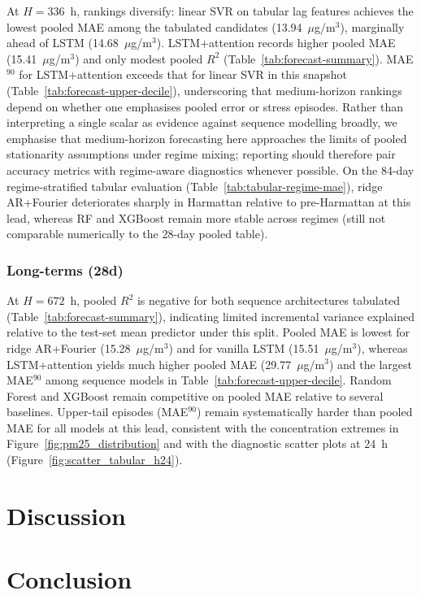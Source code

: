 \documentclass[a4paper,fleqn]{cas-sc}
\begin{document}
At $H=336$~h, rankings diversify: linear SVR on tabular lag features achieves the lowest pooled MAE among the tabulated candidates (13.94~$\mu$g/m$^3$), marginally ahead of LSTM (14.68~$\mu$g/m$^3$). LSTM+attention records higher pooled MAE (15.41~$\mu$g/m$^3$) and only modest pooled $R^2$ (Table~\ref{tab:forecast-summary}). MAE$^{90}$ for LSTM+attention exceeds that for linear SVR in this snapshot (Table~\ref{tab:forecast-upper-decile}), underscoring that medium-horizon rankings depend on whether one emphasises pooled error or stress episodes. Rather than interpreting a single scalar as evidence against sequence modelling broadly, we emphasise that medium-horizon forecasting here approaches the limits of pooled stationarity assumptions under regime mixing; reporting should therefore pair accuracy metrics with regime-aware diagnostics whenever possible. On the 84-day regime-stratified tabular evaluation (Table~\ref{tab:tabular-regime-mae}), ridge AR+Fourier deteriorates sharply in Harmattan relative to pre-Harmattan at this lead, whereas RF and XGBoost remain more stable across regimes (still not comparable numerically to the 28-day pooled table).

\subsubsection{Long-terms (28d)}\label{sec:res672}
At $H=672$~h, pooled $R^2$ is negative for both sequence architectures tabulated (Table~\ref{tab:forecast-summary}), indicating limited incremental variance explained relative to the test-set mean predictor under this split. Pooled MAE is lowest for ridge AR+Fourier (15.28~$\mu$g/m$^3$) and for vanilla LSTM (15.51~$\mu$g/m$^3$), whereas LSTM+attention yields much higher pooled MAE (29.77~$\mu$g/m$^3$) and the largest MAE$^{90}$ among sequence models in Table~\ref{tab:forecast-upper-decile}. Random Forest and XGBoost remain competitive on pooled MAE relative to several baselines. Upper-tail episodes (MAE$^{90}$) remain systematically harder than pooled MAE for all models at this lead, consistent with the concentration extremes in Figure~\ref{fig:pm25_distribution} and with the diagnostic scatter plots at 24~h (Figure~\ref{fig:scatter_tabular_h24}).

\section{Discussion}\label{sec4}

\section{Conclusion}\label{sec5}
\end{document}
